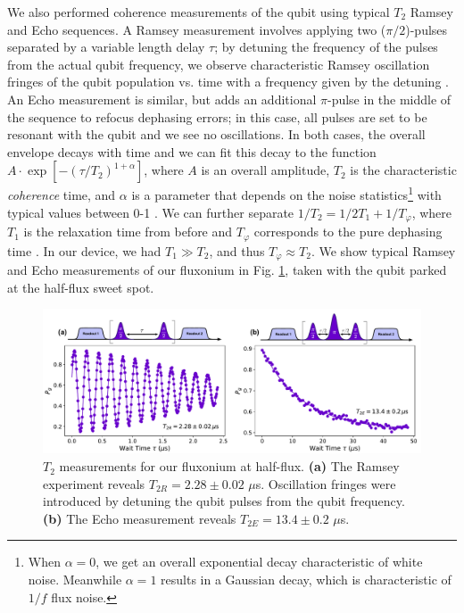 We also performed coherence measurements of the qubit using typical $T_2$ Ramsey and Echo sequences. A Ramsey measurement involves applying two ($\pi/2$)-pulses separated by a variable length delay $\tau$; by detuning the frequency of the pulses from the actual qubit frequency, we observe characteristic Ramsey oscillation fringes of the qubit population vs. time with a frequency given by the detuning \cite{raimond2006exploring, krantz2019quantum, naghiloo2019introduction}. An Echo measurement is similar, but adds an additional $\pi$-pulse in the middle of the sequence to refocus dephasing errors; in this case, all pulses are set to be resonant with the qubit and we see no oscillations. In both cases, the overall envelope decays with time and we can fit this decay to the function $A\cdot\exp[-(\tau/T_2)^{1 +\alpha}]$, where $A$ is an overall amplitude, $T_2$ is the characteristic \textit{coherence} time, and $\alpha$ is a parameter that depends on the noise statistics\footnote{When $\alpha = 0$, we get an overall exponential decay characteristic of white noise. Meanwhile $\alpha=1$ results in a Gaussian decay, which is characteristic of $1/f$ flux noise.} with typical values between 0-1 \cite{ithier2005decoherence, hutchings2017tunable, didier2019ac}. We can further separate $1/T_2 = 1/2T_1 + 1/T_\varphi$, where $T_1$ is the relaxation time from before and $T_\varphi$ corresponds to the pure dephasing time \cite{krantz2019quantum}. In our device, we had $T_1 \gg T_2$, and thus $T_\varphi \approx T_2$. We show typical Ramsey and Echo  measurements of our fluxonium in Fig. \ref{fig:4_T2_ramsey_echo}, taken with the qubit parked at the half-flux sweet spot. 
\begin{figure}[h]
    \centering
    \includegraphics[width=0.95\linewidth]{Figures/4/T2_ramsey_echo.pdf}
    \caption{$T_2$ measurements for our fluxonium at half-flux. \textbf{(a)} The Ramsey experiment reveals $T_{2R} = 2.28 \pm 0.02$ $\mu$s. Oscillation fringes were introduced by detuning the qubit pulses from the qubit frequency. \textbf{(b)} The Echo measurement reveals $T_{2E} = 13.4 \pm 0.2$ $\mu$s. }
    \label{fig:4_T2_ramsey_echo}
\end{figure}


